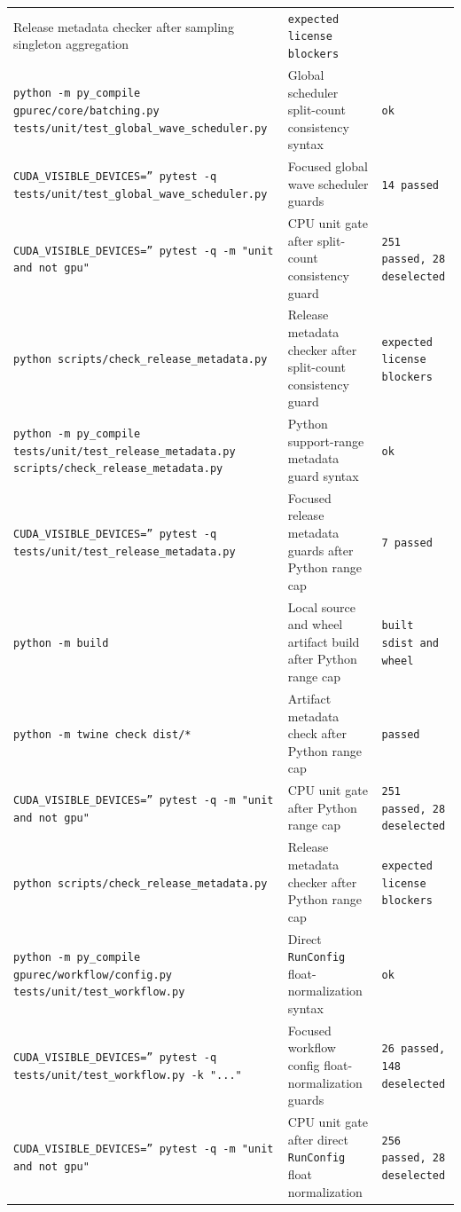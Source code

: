 \documentclass[11pt]{article}
\begin{document}
\begin{center}
\begin{tabular}{lll}
Release metadata checker after sampling singleton aggregation &
\texttt{expected license blockers} \\
\texttt{python -m py\_compile gpurec/core/batching.py tests/unit/test\_global\_wave\_scheduler.py} &
Global scheduler split-count consistency syntax &
\texttt{ok} \\
\texttt{CUDA\_VISIBLE\_DEVICES='' pytest -q tests/unit/test\_global\_wave\_scheduler.py} &
Focused global wave scheduler guards &
\texttt{14 passed} \\
\texttt{CUDA\_VISIBLE\_DEVICES='' pytest -q -m "unit and not gpu"} &
CPU unit gate after split-count consistency guard &
\texttt{251 passed, 28 deselected} \\
\texttt{python scripts/check\_release\_metadata.py} &
Release metadata checker after split-count consistency guard &
\texttt{expected license blockers} \\
\texttt{python -m py\_compile tests/unit/test\_release\_metadata.py scripts/check\_release\_metadata.py} &
Python support-range metadata guard syntax &
\texttt{ok} \\
\texttt{CUDA\_VISIBLE\_DEVICES='' pytest -q tests/unit/test\_release\_metadata.py} &
Focused release metadata guards after Python range cap &
\texttt{7 passed} \\
\texttt{python -m build} &
Local source and wheel artifact build after Python range cap &
\texttt{built sdist and wheel} \\
\texttt{python -m twine check dist/*} &
Artifact metadata check after Python range cap &
\texttt{passed} \\
\texttt{CUDA\_VISIBLE\_DEVICES='' pytest -q -m "unit and not gpu"} &
CPU unit gate after Python range cap &
\texttt{251 passed, 28 deselected} \\
\texttt{python scripts/check\_release\_metadata.py} &
Release metadata checker after Python range cap &
\texttt{expected license blockers} \\
\texttt{python -m py\_compile gpurec/workflow/config.py tests/unit/test\_workflow.py} &
Direct \texttt{RunConfig} float-normalization syntax &
\texttt{ok} \\
\texttt{CUDA\_VISIBLE\_DEVICES='' pytest -q tests/unit/test\_workflow.py -k "..."} &
Focused workflow config float-normalization guards &
\texttt{26 passed, 148 deselected} \\
\texttt{CUDA\_VISIBLE\_DEVICES='' pytest -q -m "unit and not gpu"} &
CPU unit gate after direct \texttt{RunConfig} float normalization &
\texttt{256 passed, 28 deselected} \\

\end{tabular}
\end{center}
\end{document}
